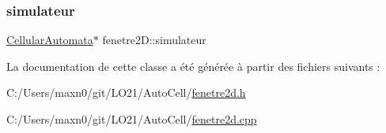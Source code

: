\mbox{\label{classfenetre2_d_a1f79d1c110a9e42c5d3d7e63d9387cca}} 
\subsubsection{\texorpdfstring{simulateur}{simulateur}}
{\footnotesize\ttfamily \mbox{\hyperlink{class_cellular_automata}{Cellular\+Automata}}$\ast$ fenetre2\+D\+::simulateur\hspace{0.3cm}{\ttfamily [private]}}



La documentation de cette classe a été générée à partir des fichiers suivants \+:\begin{DoxyCompactItemize}
\item 
C\+:/\+Users/maxn0/git/\+L\+O21/\+Auto\+Cell/\mbox{\hyperlink{fenetre2d_8h}{fenetre2d.\+h}}\item 
C\+:/\+Users/maxn0/git/\+L\+O21/\+Auto\+Cell/\mbox{\hyperlink{fenetre2d_8cpp}{fenetre2d.\+cpp}}\end{DoxyCompactItemize}
